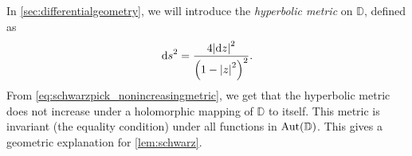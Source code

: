 \begin{remark}
    In \cref{sec:differentialgeometry}, we will introduce the \textit{hyperbolic metric} on \(\mathbb{D}\), defined as \[\dd{s}^2=\frac{4\abs{\dd{z}}^2}{\qty(1-\abs{z}^2)^2}.\]
    From \cref{eq:schwarzpick_nonincreasingmetric}, we get that the hyperbolic metric does not increase under a holomorphic mapping of \(\mathbb{D}\) to itself. This metric is invariant (the equality condition) under all functions in \(\operatorname{Aut}(\mathbb{D})\). This gives a geometric explanation for \cref{lem:schwarz}.
\end{remark}